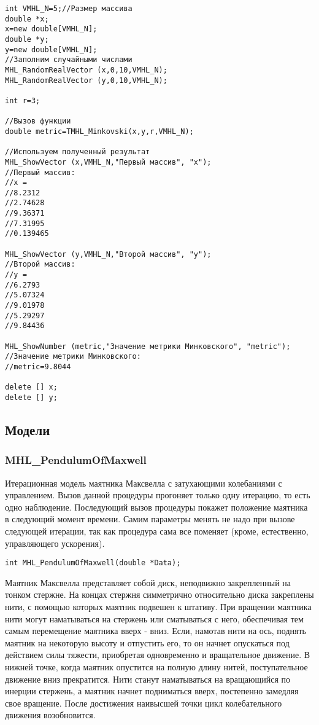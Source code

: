 \documentclass[a4paper,12pt]{article}
\begin{document}
\begin{lstlisting}[label=code_use_TMHL_Minkovski,caption=Пример использования]
int VMHL_N=5;//Размер массива
double *x;
x=new double[VMHL_N];
double *y;
y=new double[VMHL_N];
//Заполним случайными числами
MHL_RandomRealVector (x,0,10,VMHL_N);
MHL_RandomRealVector (y,0,10,VMHL_N);

int r=3;

//Вызов функции
double metric=TMHL_Minkovski(x,y,r,VMHL_N);

//Используем полученный результат
MHL_ShowVector (x,VMHL_N,"Первый массив", "x");
//Первый массив:
//x =	
//8.2312
//2.74628
//9.36371
//7.31995
//0.139465

MHL_ShowVector (y,VMHL_N,"Второй массив", "y");
//Второй массив:
//y =	
//6.2793
//5.07324
//9.01978
//5.29297
//9.84436

MHL_ShowNumber (metric,"Значение метрики Минковского", "metric");
//Значение метрики Минковского:
//metric=9.8044

delete [] x;
delete [] y;
\end{lstlisting}

\subsection{Модели}

\subsubsection{MHL\_PendulumOfMaxwell}\label{MHL_PendulumOfMaxwell}

Итерационная модель маятника Максвелла с затухающими колебаниями с управлением. Вызов данной процедуры прогоняет только одну итерацию, то есть одно наблюдение. Последующий вызов процедуры покажет положение маятника в следующий момент времени. Самим параметры менять не надо при вызове следующей итерации, так как процедура сама все поменяет (кроме, естественно, управляющего ускорения).


\begin{lstlisting}[label=code_syntax_MHL_PendulumOfMaxwell,caption=Синтаксис]
int MHL_PendulumOfMaxwell(double *Data);
\end{lstlisting}

Маятник Максвелла представляет собой диск, неподвижно закрепленный на тонком стержне. На концах стержня симметрично относительно диска закреплены нити, с помощью которых маятник подвешен к штативу. При вращении маятника нити могут наматываться на стержень или сматываться с него, обеспечивая тем самым перемещение маятника вверх - вниз. Если, намотав нити на ось, поднять маятник на некоторую высоту и отпустить его, то он начнет опускаться под действием силы тяжести, приобретая одновременно и вращательное движение. В нижней точке, когда маятник опустится на полную длину нитей, поступательное движение вниз прекратится. Нити станут наматываться на вращающийся по инерции стержень, а маятник начнет подниматься вверх, постепенно замедляя свое вращение. После достижения наивысшей точки цикл колебательного движения возобновится.
\end{document}

